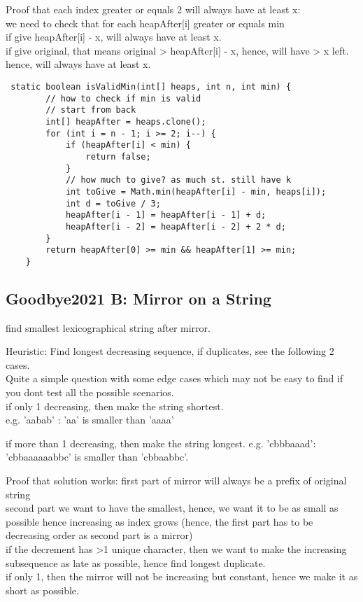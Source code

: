 \documentclass[12pt]{article}
\begin{document}
{Proof that each index greater or equals 2 will always have at least x: \\ 
we need to check that for each heapAfter[i] greater or equals min \\ 
if give heapAfter[i] - x, will always have at least x. \\ 
if give original, that means original > heapAfter[i] - x, hence, will have > x left. \\ 
hence, will always have at least x. 

\begin{verbatim} 
 static boolean isValidMin(int[] heaps, int n, int min) {
        // how to check if min is valid
        // start from back
        int[] heapAfter = heaps.clone();
        for (int i = n - 1; i >= 2; i--) {
            if (heapAfter[i] < min) {
                return false;
            }
            // how much to give? as much st. still have k
            int toGive = Math.min(heapAfter[i] - min, heaps[i]);
            int d = toGive / 3;
            heapAfter[i - 1] = heapAfter[i - 1] + d;
            heapAfter[i - 2] = heapAfter[i - 2] + 2 * d;
        }
        return heapAfter[0] >= min && heapAfter[1] >= min;
    }
\end{verbatim} 

\subsection{Goodbye2021 B: Mirror on a String} 
find smallest lexicographical string after mirror. 

Heuristic: 
Find longest decreasing sequence, if duplicates, see the following 2 cases. \\ 
Quite a simple question with some edge cases which may not be easy to find if you dont test all the possible scenarios. \\ 

if only 1 decreasing, then make the string shortest. \\ 
e.g. 'aabab' : 'aa' is smaller than 'aaaa' 

if more than 1 decreasing, then make the string longest. 
e.g. 'cbbbaaad': 'cbbaaaaaabbc' is smaller than 'cbbaabbc'. 
 
 Proof that solution works: 
 first part of mirror will always be a prefix of original string \\ 
 second part we want to have the smallest, hence, we want it to be as small as possible hence increasing as index grows (hence, the first part has to be decreasing order as second part is a mirror) \\ 
 if the decrement has >1 unique character, then we want to make the increasing subsequence as late as possible, hence find longest duplicate. \\ 
 if only 1, then the mirror will not be increasing but constant, hence we make it as short as possible. 
 
}
\end{document}
